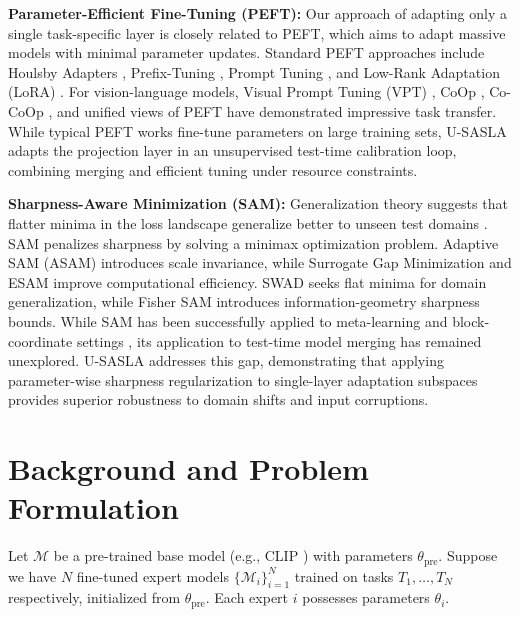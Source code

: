\documentclass{article}
\theoremstyle{plain}
\theoremstyle{definition}
\theoremstyle{remark}
\begin{document}
\textbf{Parameter-Efficient Fine-Tuning (PEFT):} Our approach of adapting only a single task-specific layer is closely related to PEFT, which aims to adapt massive models with minimal parameter updates. Standard PEFT approaches include Houlsby Adapters \cite{adapters}, Prefix-Tuning \cite{prefix_tuning}, Prompt Tuning \cite{prompt_tuning}, and Low-Rank Adaptation (LoRA) \cite{lora}. For vision-language models, Visual Prompt Tuning (VPT) \cite{vpt}, CoOp \cite{coop}, Co-CoOp \cite{cocoop}, and unified views of PEFT \cite{unified_peft} have demonstrated impressive task transfer. While typical PEFT works fine-tune parameters on large training sets, U-SASLA adapts the projection layer in an unsupervised test-time calibration loop, combining merging and efficient tuning under resource constraints.

\textbf{Sharpness-Aware Minimization (SAM):} Generalization theory suggests that flatter minima in the loss landscape generalize better to unseen test domains \cite{sam}. SAM penalizes sharpness by solving a minimax optimization problem. Adaptive SAM (ASAM) \cite{asam} introduces scale invariance, while Surrogate Gap Minimization \cite{gsam} and ESAM \cite{esam} improve computational efficiency. SWAD \cite{swad} seeks flat minima for domain generalization, while Fisher SAM \cite{fisher_sam} introduces information-geometry sharpness bounds. While SAM has been successfully applied to meta-learning \cite{maml_sharp} and block-coordinate settings \cite{saim}, its application to test-time model merging has remained unexplored. U-SASLA addresses this gap, demonstrating that applying parameter-wise sharpness regularization to single-layer adaptation subspaces provides superior robustness to domain shifts and input corruptions.

\section{Background and Problem Formulation}
\label{background}

Let $\mathcal{M}$ be a pre-trained base model (e.g., CLIP \cite{clip}) with parameters $\theta_{\text{pre}}$. Suppose we have $N$ fine-tuned expert models $\{\mathcal{M}_i\}_{i=1}^N$ trained on tasks $T_1, \dots, T_N$ respectively, initialized from $\theta_{\text{pre}}$. Each expert $i$ possesses parameters $\theta_i$. 
\end{document}
